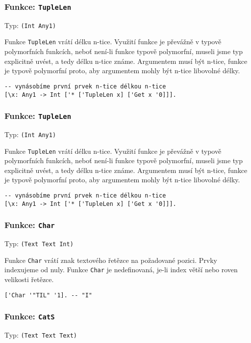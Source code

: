 \subsubsection*{Funkce: \lstinline{TupleLen}}
Typ: \lstinline{(Int Any1)}

Funkce \lstinline{TupleLen} vrátí délku n-tice. Využití funkce je převážně v typově polymorfních
funkcích, neboť není-li funkce typově polymorfní, museli jsme typ explicitně uvést, a tedy délku
n-tice známe. Argumentem musí být n-tice, funkce je typově polymorfní proto, aby argumentem mohly
být n-tice libovolné délky.

\begin{lstlisting}[caption={Ukázka využití TupleLen}]
-- vynásobíme první prvek n-tice délkou n-tice
[\x: Any1 -> Int ['* ['TupleLen x] ['Get x '0]]].
\end{lstlisting}

\subsubsection*{Funkce: \lstinline{TupleLen}}
Typ: \lstinline{(Int Any1)}

Funkce \lstinline{TupleLen} vrátí délku n-tice. Využití funkce je převážně v typově polymorfních
funkcích, neboť není-li funkce typově polymorfní, museli jsme typ explicitně uvést, a tedy délku
n-tice známe. Argumentem musí být n-tice, funkce je typově polymorfní proto, aby argumentem mohly
být n-tice libovolné délky.

\begin{lstlisting}[caption={Ukázka využití TupleLen}]
-- vynásobíme první prvek n-tice délkou n-tice
[\x: Any1 -> Int ['* ['TupleLen x] ['Get x '0]]].
\end{lstlisting}

\subsubsection*{Funkce: \lstinline{Char}}
Typ: \lstinline{(Text Text Int)}

Funkce \lstinline{Char} vrátí znak textového řetězce na požadované pozici. Prvky indexujeme od nuly.
Funkce \lstinline{Char} je nedefinovaná, je-li index větší nebo roven velikosti řetězce.


\begin{lstlisting}[caption={Ukázka využití Char}]
['Char '"TIL" '1]. -- "I"
\end{lstlisting}

\subsubsection*{Funkce: \lstinline{CatS}}
Typ: \lstinline{(Text Text Text)}

